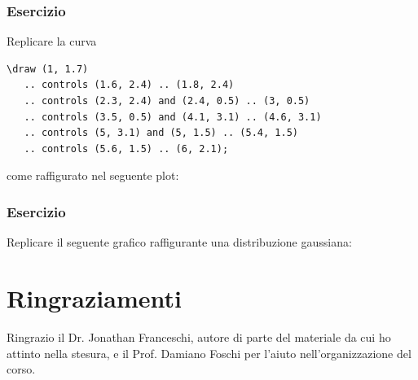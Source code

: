 \documentclass{article}
\DeclareRobustCommand{\ExternalLink}{\faLink}
\DeclareRobustCommand{\riferimento}[1]{~\href{#1}{\ExternalLink}}
\newcommand{\TikZ}{Ti{\em k}Z}
\begin{document}


\newpage
\subsubsection{Esercizio}
Replicare la curva
\begin{verbatim}
\draw (1, 1.7)
   .. controls (1.6, 2.4) .. (1.8, 2.4)
   .. controls (2.3, 2.4) and (2.4, 0.5) .. (3, 0.5)
   .. controls (3.5, 0.5) and (4.1, 3.1) .. (4.6, 3.1)
   .. controls (5, 3.1) and (5, 1.5) .. (5.4, 1.5)
   .. controls (5.6, 1.5) .. (6, 2.1);       
\end{verbatim}
come raffigurato nel seguente plot:


\subsubsection{Esercizio}
Replicare il seguente grafico raffigurante una distribuzione gaussiana:



\section{Ringraziamenti}
Ringrazio il Dr. Jonathan Franceschi, autore di parte del materiale da cui ho attinto nella stesura,
e il Prof. Damiano Foschi per l'aiuto nell'organizzazione del corso.
\end{document}
